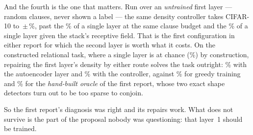 And the fourth is the one that matters. Run over an \emph{untrained} first layer --- random
clauses, never shown a label --- the same density controller takes CIFAR-10 to
\randBestAcc\,$\pm$\,\randBestSd{}\%, past the \accSingleMatched{}\% of a single layer at the
same clause budget and the \accSingleRf{}\% of a single layer given the stack's receptive
field. That is the first configuration in either report for which the second layer is worth
what it costs. On the constructed relational task, where a single layer is at chance
(\synNearSingleTask{}\%) by construction, repairing the first layer's density by either route
solves the task outright: \synNearAutoAuto{}\% with the autoencoder layer and
\synNearCalibTask{}\% with the controller, against \synNearMctmTask{}\% for greedy training
and \synNearMctmOracleSixFour{}\% for the \emph{hand-built oracle} of the first report, whose
two exact shape detectors turn out to be too sparse to conjoin.

So the first report's diagnosis was right and its repairs work. What does not survive is the
part of the proposal nobody was questioning: that layer~1 should be trained.
